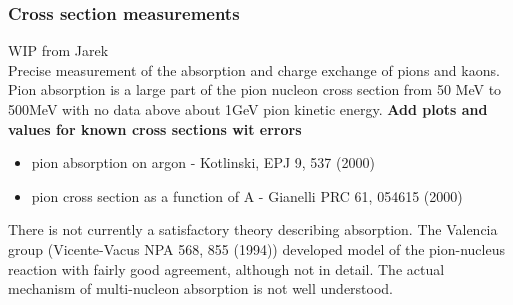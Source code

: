 % 
%


\subsubsection{Cross section measurements}
WIP from Jarek\\

Precise measurement of the  absorption and charge exchange of pions and kaons. Pion absorption is a large part of the pion nucleon cross section from 50 MeV to 500MeV with no data above about 1GeV pion kinetic energy. 
{\bf Add plots and values for known cross sections wit errors} 
\begin{itemize}
\item pion absorption on argon - Kotlinski, EPJ 9, 537 (2000)
\item pion cross section as a function of A - Gianelli PRC 61, 054615 (2000)
\end{itemize}
There is not currently a satisfactory theory describing absorption. The Valencia group (Vicente-Vacus NPA 568, 855 (1994)) developed model of    the pion-nucleus reaction with fairly good agreement, although not in detail. The actual  mechanism of multi-nucleon absorption
 is not well understood. 
 


